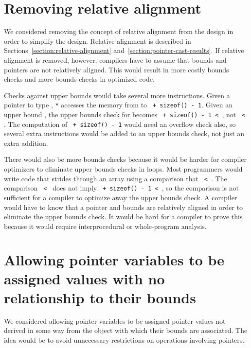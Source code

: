 \section{Removing relative alignment}
\label{section:design-alternatives:always-unaligned}

We considered removing the concept of relative alignment from the design in order
to simplify the design. 
Relative alignment is described in Sections~\ref{section:relative-alignment}
and~\ref{section:pointer-cast-results}.  If relative alignment
is removed, however, compilers have to assume that bounds and pointers are
not relatively aligned.   This would result in more costly bounds checks and
more bounds checks in optimized code.

Checks against upper bounds would  take several more instructions.
Given a pointer  to type , \texttt{*} accesses the memory from
 to \texttt{ + sizeof() - 1}. Given an upper bound , the
upper bounds check for  becomes \texttt{ + sizeof() - 1 < },
not \texttt{ < }.  The
computation of \texttt{ + sizeof() - 1} would need an overflow check also, 
so several extra instructions would be added to an upper bounds check, 
not just an extra addition.

There would also be more bounds checks because it would be harder for compiler optimizers
to eliminate upper bounds checks in loops.  Most programmers would write code that
strides through an array using a comparison that
\texttt{ \textless{} }. The comparison 
\texttt{ < } does not imply
\texttt{ + sizeof() - 1 < }, so the comparison is
not sufficient for a compiler to optimize away
the upper bounds check. A compiler would have to know that a pointer
and bounds are relatively aligned in order to eliminate the upper bounds
check. It would be hard for a compiler to prove this because it would
require interprocedural or whole-program analysis.

\section{Allowing pointer variables to be assigned values with no relationship to their bounds}

We considered allowing pointer variables to be assigned pointer values
not derived in some way from the object with which their bounds are
associated. The idea would be to avoid unnecessary restrictions on
operations involving pointers.

